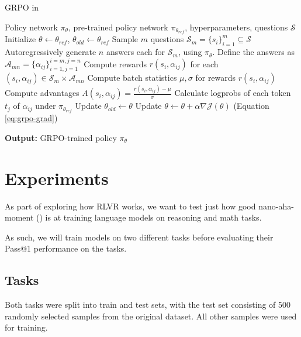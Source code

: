 \documentclass{article} %
\theoremstyle{definition}
\begin{document}
\begin{algorithm}
    \caption{GRPO in \cite{nano-aha-moment}}
    \begin{algorithmic}[1]
        \State Policy network $\pi_\theta$, pre-trained policy network $\pi_{\theta_{ref}}$, 
        hyperparameters, questions $\mathcal{S}$
        \State Initialize $\theta \leftarrow \theta_{ref}$, $\theta_{old} \leftarrow \theta_{ref}$
            \State Sample $m$ questions $\mathcal{S}_m = \{s_i\}_{i=1}^m \subseteq \mathcal{S}$
            \State Autoregressively generate $n$ answers each for $\mathcal{S}_m$, using $\pi_\theta$. Define the answers as $\mathcal{A}_{mn} = \{\alpha_{ij}\}_{i=1, j=1}^{i=m, j=n}$
            \State Compute rewards $r(s_i, \alpha_{ij})$ for each $(s_i, \alpha_{ij}) \in \mathcal{S}_m \times \mathcal{A}_{mn}$
            \State Compute batch statistics $\mu, \sigma$ for rewards $r(s_i, \alpha_{ij})$
            \State Compute advantages $A(s_i, \alpha_{ij}) = \frac{r(s_i, \alpha_{ij}) - \mu}{\sigma}$
            \State Calculate logprobs of each token $t_j$ of $\alpha_{ij}$ under $\pi_{\theta_{ref}}$
            \State Update $\theta_{old} \leftarrow \theta$
            \State Update $\theta \leftarrow \theta + \alpha \nabla \mathcal{J}(\theta)$ (Equation \ref{eq:grpo-grad})
        \EndWhile

        \hspace*{-40pt} \textbf{Output:} GRPO-trained policy $\pi_\theta$
    \end{algorithmic}

    \label{alg:grpo-nano-aha-moment}
\end{algorithm}


\section{Experiments}

As part of exploring how RLVR works, we want to test
just how good nano-aha-moment (\cite{nano-aha-moment})
is at training language models on reasoning and math tasks.

As such, we will train models on two different tasks before evaluating
their Pass@1 performance on the tasks.

\subsection{Tasks}
Both tasks were split into train and test sets, with
the test set consisting of 500 randomly selected samples from the original dataset. All other samples were used for training.
\end{document}
